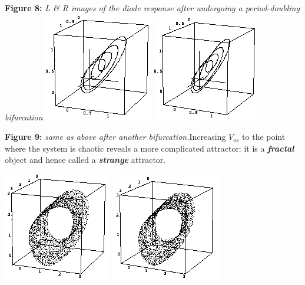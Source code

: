 \documentclass{../lab}
\begin{document}
\textbf{Figure 8:} \emph{L \& R images of the diode response after undergoing a period-doubling bifurcation}\noindent
\href{http://experimentationlab.berkeley.edu/sites/default/files/images/Nldimage046.gif}{\includegraphics[width=0.33\linewidth,keepaspectratio]{images/Nldimage046.png}}
\href{http://experimentationlab.berkeley.edu/sites/default/files/images/Nldimage047.gif}{\includegraphics[width=0.33\linewidth,keepaspectratio]{images/Nldimage047.png}}

\textbf{Figure 9: } \emph{same as above after another bifurcation.}Increasing  $V_{os}$ to the point where the system is chaotic reveals a more complicated attractor: it is a \emph{\textbf{fractal}} object and hence called a \emph{\textbf{strange}} attractor.

\noindent
\href{http://experimentationlab.berkeley.edu/sites/default/files/images/Nldimage048.gif}{\includegraphics[width=0.33\linewidth,keepaspectratio]{images/Nldimage048.png}}
\href{http://experimentationlab.berkeley.edu/sites/default/files/images/Nldimage049.gif}{\includegraphics[width=0.33\linewidth,keepaspectratio]{images/Nldimage049.png}}
\end{document}

